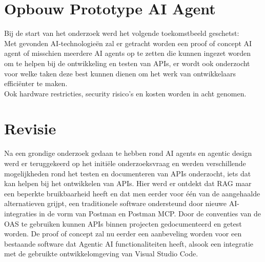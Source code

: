 
\section{Opbouw Prototype AI Agent}
\label{sec:opbouwprototypeaiagent}

Bij de start van het onderzoek werd het volgende toekomstbeeld geschetst: \\

Met gevonden AI-technologieën zal er getracht worden een proof of concept AI agent of misschien meerdere AI agents op te zetten die kunnen ingezet worden om te helpen bij de ontwikkeling en testen van APIs, er wordt ook onderzocht voor welke taken deze best kunnen dienen om het werk van ontwikkelaars efficiënter te maken. \\

Ook hardware restricties, security risico's en kosten worden in acht genomen.

\section{Revisie}
\label{sec:revisie}
Na een grondige onderzoek gedaan te hebben rond AI agents en agentic design werd er teruggekeerd op het initiële onderzoeksvraag en werden verschillende mogelijkheden rond het testen en documenteren van APIs onderzocht, iets dat kan helpen bij het ontwikkelen van APIs. Hier werd er ontdekt dat RAG maar een beperkte bruikbaarheid heeft en dat men eerder voor één van de aangehaalde alternatieven grijpt, een traditionele software ondersteund door nieuwe AI-integraties in de vorm van Postman en Postman MCP. Door de conventies van de OAS te gebruiken kunnen APIs binnen projecten gedocumenteerd en getest worden. De proof of concept zal nu eerder een aanbeveling worden voor een bestaande software dat Agentic AI functionaliteiten heeft, alsook een integratie met de gebruikte ontwikkelomgeving van Visual Studio Code. \\


